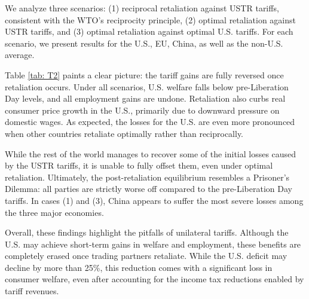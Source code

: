 \documentclass[12pt]{article}
\begin{document}
We analyze three scenarios: (1) reciprocal retaliation against USTR tariffs, consistent with the WTO's reciprocity principle, (2) optimal retaliation against USTR tariffs, and (3) optimal retaliation against optimal U.S. tariffs. For each scenario, we present results for the U.S., EU, China, as well as the non-U.S. average.

Table \ref{tab: T2} paints a clear picture: the tariff gains are fully reversed once retaliation occurs. Under all scenarios, U.S. welfare falls below pre-Liberation Day levels, and all employment gains are undone. Retaliation also curbs real consumer price growth in the U.S., primarily due to downward pressure on domestic wages. As expected, the losses for the U.S. are even more pronounced when other countries retaliate optimally rather than reciprocally.

While the rest of the world manages to recover some of the initial losses caused by the USTR tariffs, it is unable to fully offset them, even under optimal retaliation. Ultimately, the post-retaliation equilibrium resembles a Prisoner's Dilemma: all parties are strictly worse off compared to the pre-Liberation Day tariffs. In cases (1) and (3), China appears to suffer the most severe losses among the three major economies.

Overall, these findings highlight the pitfalls of unilateral tariffs. Although the U.S. may achieve short-term gains in welfare and employment, these benefits are completely erased once trading partners retaliate. While the U.S. deficit may decline by more than 25\%, this reduction comes with a significant loss in consumer welfare, even after accounting for the income tax reductions enabled by tariff revenues.
\end{document}
